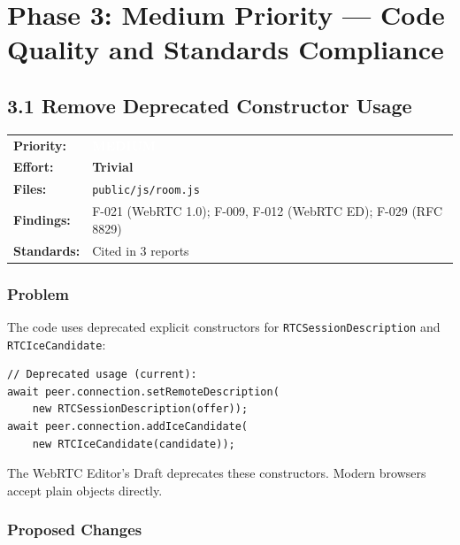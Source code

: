 \documentclass[11pt,letterpaper]{article}
\newcommand{\primedium}{\colorbox{minor!80!black}{\textcolor{white}{\small\textbf{MEDIUM}}}}
\newcommand{\efftrivial}{\colorbox{compliant!20}{\small\textbf{Trivial}}}
\begin{document}
\newpage

\section{Phase 3: Medium Priority --- Code Quality and Standards Compliance}

\subsection{3.1 Remove Deprecated Constructor Usage}

\begin{tabular}{ll}
\textbf{Priority:} & \primedium \\
\textbf{Effort:} & \efftrivial \\
\textbf{Files:} & \texttt{public/js/room.js} \\
\textbf{Findings:} & F-021 (WebRTC 1.0); F-009, F-012 (WebRTC ED); F-029 (RFC 8829) \\
\textbf{Standards:} & Cited in 3 reports \\
\end{tabular}

\subsubsection{Problem}

The code uses deprecated explicit constructors for \texttt{RTCSessionDescription} and \texttt{RTCIceCandidate}:

\begin{verbatim}
// Deprecated usage (current):
await peer.connection.setRemoteDescription(
    new RTCSessionDescription(offer));
await peer.connection.addIceCandidate(
    new RTCIceCandidate(candidate));
\end{verbatim}

The WebRTC Editor's Draft deprecates these constructors. Modern browsers accept plain objects directly.

\subsubsection{Proposed Changes}
\end{document}
